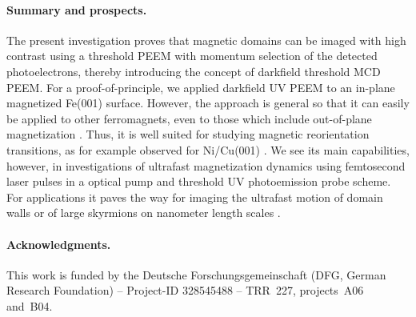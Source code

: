 \documentclass[prl,twocolumn,floatfix,superscriptaddress,aps]{revtex4-2}
\begin{document}
\paragraph{Summary and prospects.} The present investigation proves that magnetic domains can be imaged with high contrast using a threshold PEEM with momentum selection of the detected photoelectrons, thereby introducing the concept of darkfield threshold MCD PEEM\@. 
For a proof-of-principle, we applied darkfield UV PEEM to an in-plane magnetized Fe(001) surface. However, the approach is general so that it can easily be applied to other ferromagnets, even to those which include out-of-plane magnetization \cite{kronseder2011}. Thus, it is well suited for studying magnetic reorientation transitions, as for example observed for Ni/Cu(001) \cite{henk1999,sander2004,nakagawa2006,kronseder2011}. We see its main capabilities, however, in investigations of ultrafast magnetization dynamics using femtosecond laser pulses in a optical pump and threshold UV photoemission probe scheme. For applications it paves the way for imaging the ultrafast motion of domain walls \cite{parkin2008} or of large skyrmions on nanometer length scales \cite{goebel2019,jani2021,kern2022}.

\paragraph{Acknowledgments.} This work is funded by the Deutsche Forschungsgemeinschaft (DFG, German Research Foundation) -- Project-ID 328545488 -- TRR~227, projects~A06 and~B04.

% 


\listoftodos
\end{document}
